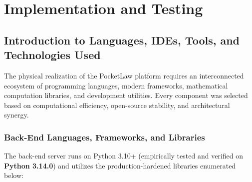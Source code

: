 \chapter{Implementation and Testing}
\label{chap:implementation_testing}

\section{Introduction to Languages, IDEs, Tools, and Technologies Used}
\label{sec:tech_stack}

The physical realization of the PocketLaw platform requires an interconnected ecosystem of programming languages, modern frameworks, mathematical computation libraries, and development utilities. Every component was selected based on computational efficiency, open-source stability, and architectural synergy.

\subsection{Back-End Languages, Frameworks, and Libraries}
The back-end server runs on Python 3.10+ (empirically tested and verified on \textbf{Python 3.14.0}) and utilizes the production-hardened libraries enumerated below:

